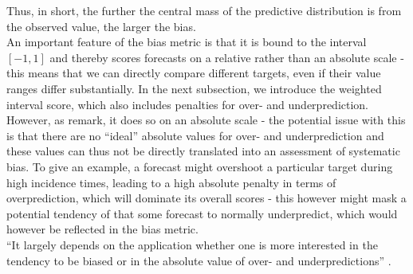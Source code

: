 Thus, in short, the further the central mass of the predictive distribution is from the observed value, the larger the bias.\\
An important feature of the bias metric is that it is bound to the interval $[-1,1]$ and thereby scores forecasts on a relative rather than an absolute scale - this means that we can directly compare different targets, even if their value ranges differ substantially.
In the next subsection, we introduce the weighted interval score, which also includes penalties for over- and underprediction. However, as \citep{bosse_evaluating_2022} remark, it does so on an absolute scale - the potential issue with this is that there are no ``ideal'' absolute values for over- and underprediction and these values can thus not be directly translated into an assessment of systematic bias. To give an example, a forecast might overshoot a particular target during high incidence times, leading to a high absolute penalty in terms of overprediction, which will dominate its overall scores - this however might mask a potential tendency of that some forecast to normally underpredict, which would however be reflected in the bias metric.\\
``It largely depends on the application whether one is more interested in the tendency to be biased or in the absolute value of over- and underpredictions'' \citep{bosse_evaluating_2022}.
